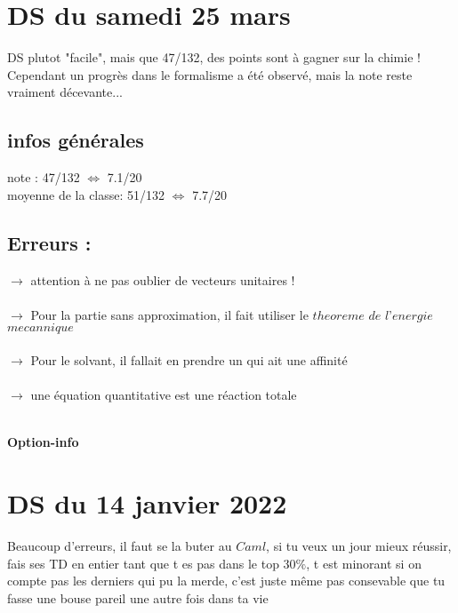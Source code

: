 \documentclass{book}
\begin{document}
\section{DS du samedi 25 mars }

\begin{tcolorbox}[width={14cm},colback={yellow!20!white},title={\textbf{Commentaire générale sur ce DS}},colbacktitle=red!40!white,coltitle=black]    
	DS plutot "facile", mais que 47/132, des points sont à gagner sur la chimie ! Cependant un progrès dans le formalisme a été observé, mais la note reste vraiment décevante...
\end{tcolorbox}

\subsection{infos générales}

note : 47/132 $\Leftrightarrow$ 7.1/20 \\
moyenne de la classe: 51/132 $\Leftrightarrow$ 7.7/20


\subsection{Erreurs : }

$\rightarrow$ attention à ne pas oublier de vecteurs unitaires ! \\ \\
$\rightarrow$ Pour la partie sans approximation, il fait utiliser le $theoreme$ $de$ $l$'$energie$ $mecannique$ \\ \\
$\rightarrow$ Pour le solvant, il  fallait en prendre un qui ait une affinité \\ \\
$\rightarrow$ une équation quantitative est une réaction totale \\ \\



\begin{center}
\textbf{\large Option-info}
\end{center}

\vspace{0.6cm}

\section{DS du 14 janvier 2022}

\begin{tcolorbox}[width={14cm},colback={yellow!20!white},title={\textbf{Commentaire générale sur ce DS}},colbacktitle=red!40!white,coltitle=black]
	Beaucoup d'erreurs, il faut se la buter au $Caml$, si tu veux un jour mieux réussir, fais ses TD en entier tant que t es pas dans le top $30\%$, t est minorant si on compte pas les derniers qui pu la merde, c'est juste même pas consevable que tu fasse une bouse pareil une autre fois dans ta vie
\end{tcolorbox}
\end{document}
